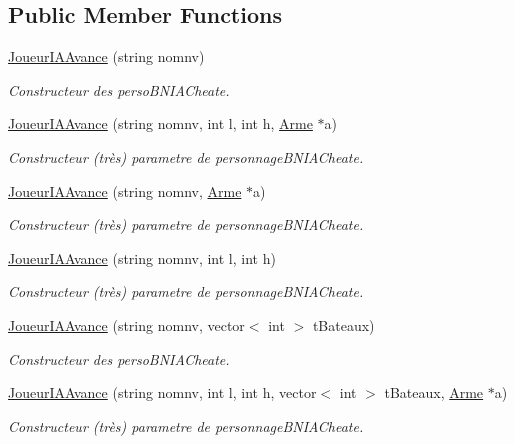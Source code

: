 \subsection*{Public Member Functions}
\begin{DoxyCompactItemize}
\item 
\hyperlink{classJoueurIAAvance_afd35289c0c99c9907aa74f7951d6d493}{Joueur\-I\-A\-Avance} (string nomnv)
\begin{DoxyCompactList}\small\item\em Constructeur des perso\-B\-N\-I\-A\-Cheate. \end{DoxyCompactList}\item 
\hyperlink{classJoueurIAAvance_aa4a13dd7828d55388cb3aa3c6f37d19a}{Joueur\-I\-A\-Avance} (string nomnv, int l, int h, \hyperlink{classArme}{Arme} $\ast$a)
\begin{DoxyCompactList}\small\item\em Constructeur (très) parametre de personnage\-B\-N\-I\-A\-Cheate. \end{DoxyCompactList}\item 
\hyperlink{classJoueurIAAvance_a300ba264da26073b86421fa56aaf2480}{Joueur\-I\-A\-Avance} (string nomnv, \hyperlink{classArme}{Arme} $\ast$a)
\begin{DoxyCompactList}\small\item\em Constructeur (très) parametre de personnage\-B\-N\-I\-A\-Cheate. \end{DoxyCompactList}\item 
\hyperlink{classJoueurIAAvance_a6f98205a559a9a7534e4cec8f3ad1235}{Joueur\-I\-A\-Avance} (string nomnv, int l, int h)
\begin{DoxyCompactList}\small\item\em Constructeur (très) parametre de personnage\-B\-N\-I\-A\-Cheate. \end{DoxyCompactList}\item 
\hyperlink{classJoueurIAAvance_ae42874056d41e9be7952bfc279739a88}{Joueur\-I\-A\-Avance} (string nomnv, vector$<$ int $>$ t\-Bateaux)
\begin{DoxyCompactList}\small\item\em Constructeur des perso\-B\-N\-I\-A\-Cheate. \end{DoxyCompactList}\item 
\hyperlink{classJoueurIAAvance_afd25e5803822139fb16a4a003cdabfa0}{Joueur\-I\-A\-Avance} (string nomnv, int l, int h, vector$<$ int $>$ t\-Bateaux, \hyperlink{classArme}{Arme} $\ast$a)
\begin{DoxyCompactList}\small\item\em Constructeur (très) parametre de personnage\-B\-N\-I\-A\-Cheate. \end{DoxyCompactList}\item 

\end{DoxyCompactItemize}
